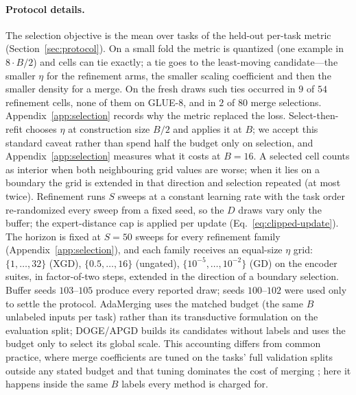\documentclass{article} %
\begin{document}
\paragraph{Protocol details.}
The selection objective is the mean over tasks of the held-out per-task metric (Section~\ref{sec:protocol}). On a small fold the metric is quantized (one example in $8\cdot B/2$) and cells can tie exactly; a tie goes to the least-moving candidate---the smaller $\eta$ for the refinement arms, the smaller scaling coefficient and then the smaller density for a merge. On the fresh draws such ties occurred in $9$ of $54$ refinement cells, none of them on GLUE-8, and in $2$ of $80$ merge selections. Appendix~\ref{app:selection} records why the metric replaced the loss. Select-then-refit chooses $\eta$ at construction size $B/2$ and applies it at $B$; we accept this standard caveat rather than spend half the budget only on selection, and Appendix~\ref{app:selection} measures what it costs at $B=16$. A selected cell counts as interior when both neighbouring grid values are worse; when it lies on a boundary the grid is extended in that direction and selection repeated (at most twice). Refinement runs $S$ sweeps at a constant learning rate with the task order re-randomized every sweep from a fixed seed, so the $D$ draws vary only the buffer; the expert-distance cap is applied per update (Eq.~\eqref{eq:clipped-update}). The horizon is fixed at $S=50$ sweeps for every refinement family (Appendix~\ref{app:selection}), and each family receives an equal-size $\eta$ grid: $\{1,\ldots,32\}$ (XGD), $\{0.5,\ldots,16\}$ (ungated), $\{10^{-5},\ldots,10^{-2}\}$ (GD) on the encoder suites, in factor-of-two steps, extended in the direction of a boundary selection. Buffer seeds $103$--$105$ produce every reported draw; seeds $100$--$102$ were used only to settle the protocol. AdaMerging uses the matched budget (the same $B$ unlabeled inputs per task) rather than its transductive formulation on the evaluation split; DOGE/APGD builds its candidates without labels and uses the budget only to select its global scale. This accounting differs from common practice, where merge coefficients are tuned on the tasks' full validation splits outside any stated budget \citep{ilharco2022taskarithmetic,yadav2023ties} and that tuning dominates the cost of merging \citep{he2025mergebench}; here it happens inside the same $B$ labels every method is charged for.
\end{document}
